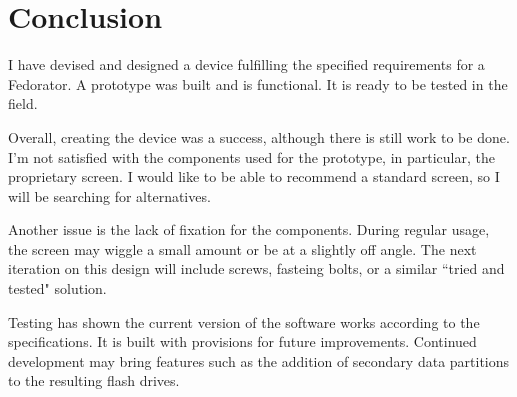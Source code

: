     \section{Conclusion}
        I have devised and designed a device fulfilling the specified requirements for a Fedorator.  A prototype was built and is functional.  It is ready to be tested in the field.
        
        Overall, creating the device was a success, although there is still work to be done.  I'm not satisfied with the components used for the prototype, in particular, the proprietary screen.  I would like to be able to recommend a standard screen, so I will be searching for alternatives.
        
        Another issue is the lack of fixation for the components.  During regular usage, the screen may wiggle a small amount or be at a slightly off angle.  The next iteration on this design will include screws, fasteing bolts, or a similar ``tried and tested" solution.
        
        Testing has shown the current version of the software works according to the specifications.  It is built with provisions for future improvements.  Continued development may bring features such as the addition of secondary data partitions to the resulting flash drives.
        
